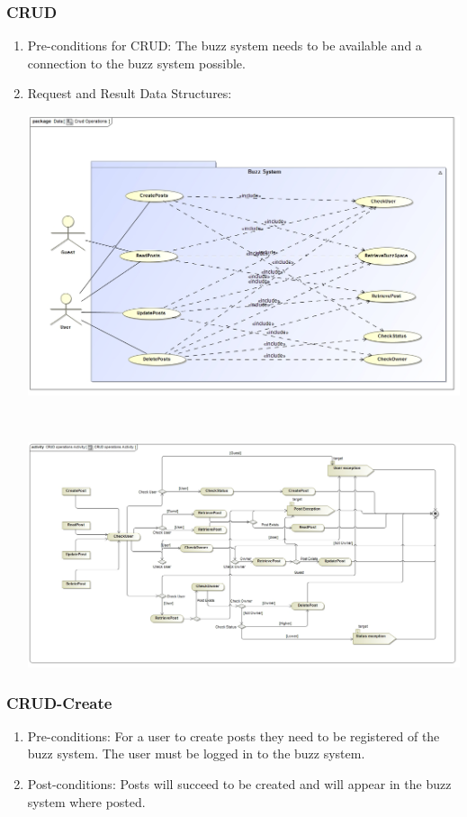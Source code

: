\documentclass[hidelinks, 12pt, oneside]{article}
\begin{document}
\subsubsection{CRUD}
\begin{enumerate}
 \item Pre-conditions for CRUD: The buzz system needs to be available and a connection to the buzz system possible.
 
  \item Request and Result Data Structures: \\
 \centerline{\includegraphics[scale=0.3]{CRUDOperations}}\\
 \centerline{\includegraphics[scale=0.3]{CRUDOperationsActivity}} 
\end{enumerate}

\subsubsection{CRUD-Create}
\begin{enumerate}
 \item Pre-conditions: For a user to create posts they need to be registered of the buzz system. The user must be logged in to the buzz system.

 \item Post-conditions: Posts will succeed to be created and will appear in the buzz system where posted.

\end{enumerate}
\end{document}
